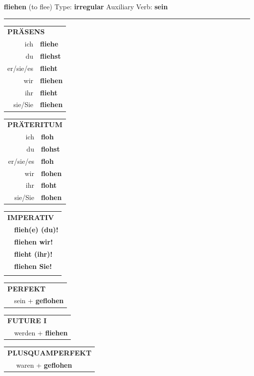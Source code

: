\documentclass[10pt,a4paper]{revtex4-2}
\begin{document}
\begin{verbbox}
    {\Large \bf fliehen} (to flee) \hfill Type: \textbf{irregular} \hfill Auxiliary Verb: \textbf{sein} 
    
     \vspace{5pt}

    \hrule
    
    \vspace{5pt}

  \begin{tabular}{rl}
     \multicolumn{2}{l}{\textbf{PRÄSENS} }\\
    ich & \textbf{fliehe}\\
    du & \textbf{fliehst}\\
    er/sie/es & \textbf{flieht}\\
    wir & \textbf{fliehen}\\
    ihr & \textbf{flieht}\\
    sie/Sie & \textbf{fliehen}\\
  \end{tabular}
  \hfill
     \begin{tabular}{rl}
    \multicolumn{2}{l}{\textbf{PRÄTERITUM} }\\
    ich & \textbf{floh}\\
    du & \textbf{flohst}\\
    er/sie/es & \textbf{floh}\\
    wir & \textbf{flohen}\\
    ihr & \textbf{floht}\\
    sie/Sie & \textbf{flohen}\\
  \end{tabular}
  \hfill
  \begin{tabular}{rl}
     \multicolumn{2}{l}{\textbf{IMPERATIV} }\\
   & \textbf{flieh(e) (du)!}\\
   & \textbf{fliehen wir!}\\
   & \textbf{flieht (ihr)!}\\
   & \textbf{fliehen Sie!}\\
   & \vspace{10pt}
  \end{tabular}

    \vspace{10pt}

 \begin{tabular}{rl}
     \multicolumn{2}{l}{\textbf{PERFEKT}}\\
   & sein + \textbf{geflohen}\\
  \end{tabular}
\hfill
   \begin{tabular}{rl}
    \multicolumn{2}{l}{\textbf{FUTURE I} }\\
   & werden + \textbf{fliehen}\\
  \end{tabular}
\hfill
   \begin{tabular}{rl}
      \multicolumn{2}{l}{\textbf{PLUSQUAMPERFEKT}}\\
   & waren + \textbf{geflohen}\\
  \end{tabular}


\end{verbbox}
\end{document}
